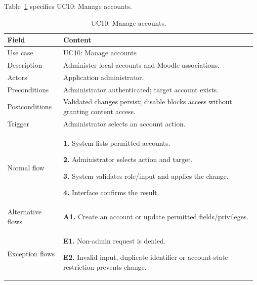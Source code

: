 \needspace{.39\textheight}
Table~\ref{tab:uc-10} specifies UC10: Manage accounts.
\begin{table}[H]\centering\footnotesize{}\renewcommand{\arraystretch}{1.05}
\caption{UC10: Manage accounts.}\label{tab:uc-10}
\begin{tabular}{|p{2.8cm}|p{11.9cm}|}\hline
\textbf{Field} & \textbf{Content}\\\hline
Use case & UC10: Manage accounts\\\hline
Description & Administer local accounts and Moodle associations.\\\hline
Actors & Application administrator.\\\hline
Preconditions & Administrator authenticated; target account exists.\\\hline
Postconditions & Validated changes persist; disable blocks access without granting content access.\\\hline
Trigger & Administrator selects an account action.\\\hline
Normal flow & \textbf{1.} System lists permitted accounts.\par \textbf{2.} Administrator selects action and target.\par \textbf{3.} System validates role/input and applies the change.\par \textbf{4.} Interface confirms the result.\\\hline
Alternative flows & \textbf{A1.} Create an account or update permitted fields/privileges.\\\hline
Exception flows & \textbf{E1.} Non-admin request is denied.\par \textbf{E2.} Invalid input, duplicate identifier or account-state restriction prevents change.\\\hline
\end{tabular}\end{table}

